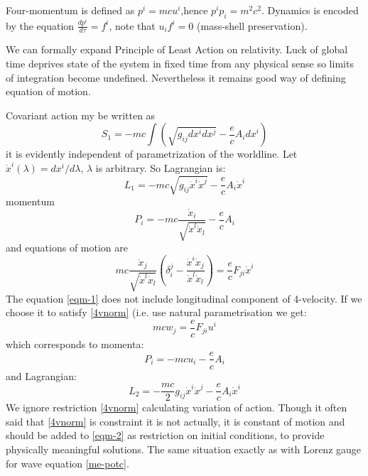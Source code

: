 Four-momentum is defined as $p^i = m c u^i$,hence $ p^i p_i = m^2 c^2$.
Dynamics is encoded by the equation $\frac{dp^i}{d\tau} = f^i$, note that $ u_i f^i = 0$ (mass-shell preservation).

We can formally expand Principle of Least Action on relativity. Luck of global time 
deprives state of the system in fixed time from any physical sense so limits of integration
become undefined. Nevertheless it remains good way of defining equation of motion.

Covariant action my be written as  
\begin{equation}
   \label {act-1}
    S_1=-m c \int (\sqrt{g_{i j} d x^i d x^j}  - \frac{e}{c} A_i d x^i)
\end{equation}
it is evidently independent of parametrization of the worldline. 
Let $ \dot x^i (\lambda)=d x^i / d \lambda $, $ \lambda $ is 
arbitrary. So Lagrangian is:
\begin{equation}
   \label {lag-1}
    L_1=-m c \sqrt{g_{i j} \dot x^i \dot x^j} -\frac{e}{c} A_i \dot x^i
\end{equation}
momentum 
\begin{equation}
   \label {mom-1}
   P_i = -m c \frac{\dot x_i}{\sqrt{\dot x^l \dot x_l}} -\frac{e}{c} A_i
\end{equation}
and equations of motion are
\begin{equation}
   \label {eqm-1}
    m c \frac{\ddot x_j}{\sqrt{\dot x^l \dot x_l}} (\delta_i^j -
    \frac{\dot x^i \dot x_j}{\dot x^l \dot x_l}) = \frac{e}{c} F_{j i} \dot x^i
\end{equation}
The equation \eqref{eqm-1} does not include longitudinal component of 
4-velocity. If we choose it to satisfy \eqref{4vnorm} (i.e. use natural
parametrisation we get:
\begin{equation}
   \label {eqm-2}
    m c w_j = \frac{e}{c} F_{j i} u^i
\end{equation}
which corresponds to momenta:
\begin{equation}
   \label {mom-2}
   P_i = -m c  u_i -\frac{e}{c} A_i
\end{equation}
and Lagrangian:
\begin{equation}
   \label {lag-2}
    L_2=- \frac{m c}{2} g_{i j} \dot x^i \dot x^j -\frac{e}{c} A_i \dot x^i
\end{equation}
We ignore restriction \eqref{4vnorm} calculating variation of action. 
Though it often said that \eqref{4vnorm} is constraint it is not
actually, it is constant of motion and should be added to \eqref{eqm-2}
as restriction on initial conditions, to provide physically meaningful
solutions. The same situation exactly as with Lorenz gauge for wave
equation \eqref{me-potc}.

